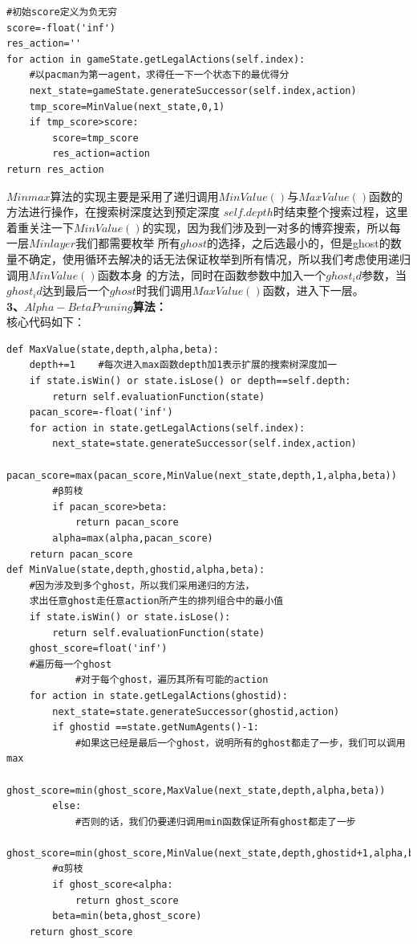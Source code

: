 \documentclass[a4paper,12pt,UTF8]{article}
\begin{document}
\begin{flushleft}
{{\begin{lstlisting}
#初始score定义为负无穷
score=-float('inf')
res_action=''
for action in gameState.getLegalActions(self.index):
    #以pacman为第一agent，求得任一下一个状态下的最优得分
    next_state=gameState.generateSuccessor(self.index,action)
    tmp_score=MinValue(next_state,0,1)
    if tmp_score>score:
        score=tmp_score
        res_action=action
return res_action
        \end{lstlisting}
    }
    \normalsize{
        \hspace{1cm}$Minmax$算法的实现主要是采用了递归调用$MinValue()$与$MaxValue()$函数的方法进行操作，在搜索树深度达到预定深度
        $self.depth$时结束整个搜索过程，这里着重关注一下$MinValue()$的实现，因为我们涉及到一对多的博弈搜索，所以每一层$Minlayer$我们都需要枚举
        所有$ghost$的选择，之后选最小的，但是ghost的数量不确定，使用循环去解决的话无法保证枚举到所有情况，所以我们考虑使用递归调用$MinValue()$函数本身
        的方法，同时在函数参数中加入一个$ghost_id$参数，当$ghost_id$达到最后一个$ghost$时我们调用$MaxValue()$函数，进入下一层。\\
    }
    \large{
        \hspace{1cm}\textbf{3、$Alpha-Beta Pruning$算法：\\}
    }
    \normalsize{
        \hspace{1cm}核心代码如下：\\
    }
    \scriptsize{
        \begin{lstlisting}
def MaxValue(state,depth,alpha,beta):
    depth+=1    #每次进入max函数depth加1表示扩展的搜索树深度加一
    if state.isWin() or state.isLose() or depth==self.depth:
        return self.evaluationFunction(state)
    pacan_score=-float('inf')
    for action in state.getLegalActions(self.index):
        next_state=state.generateSuccessor(self.index,action)
        pacan_score=max(pacan_score,MinValue(next_state,depth,1,alpha,beta))
        #β剪枝
        if pacan_score>beta:
            return pacan_score
        alpha=max(alpha,pacan_score)
    return pacan_score
def MinValue(state,depth,ghostid,alpha,beta):
    #因为涉及到多个ghost，所以我们采用递归的方法，
    求出任意ghost走任意action所产生的排列组合中的最小值
    if state.isWin() or state.isLose():
        return self.evaluationFunction(state)
    ghost_score=float('inf')
    #遍历每一个ghost         
            #对于每个ghost，遍历其所有可能的action
    for action in state.getLegalActions(ghostid):
        next_state=state.generateSuccessor(ghostid,action)
        if ghostid ==state.getNumAgents()-1:
            #如果这已经是最后一个ghost，说明所有的ghost都走了一步，我们可以调用max
            ghost_score=min(ghost_score,MaxValue(next_state,depth,alpha,beta))
        else:
            #否则的话，我们仍要递归调用min函数保证所有ghost都走了一步
            ghost_score=min(ghost_score,MinValue(next_state,depth,ghostid+1,alpha,beta))
        #α剪枝
        if ghost_score<alpha:
            return ghost_score
        beta=min(beta,ghost_score)
    return ghost_score



\end{lstlisting}}}
\end{flushleft}
\end{document}
